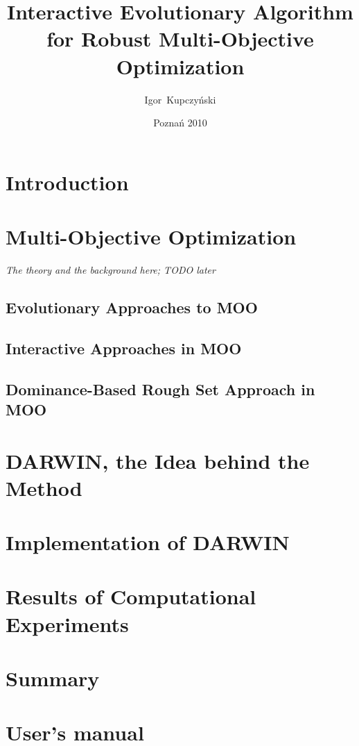 \documentclass[a4paper,english,thesis]{dcsbook}
\author{Igor~Kupczy\'nski}
\date{Pozna\'n 2010}
\title{Interactive Evolutionary Algorithm \\ for Robust Multi-Objective
  Optimization}
\begin{document}
\maketitle
\frontmatter
\tableofcontents{}
\mainmatter

\chapter{Introduction}

\chapter{Multi-Objective Optimization}
\textit{The theory and the background here; TODO later}
\section{Evolutionary Approaches to MOO}
\label{sec_ea_in_moo}
\section{Interactive Approaches in MOO}
\label{sec_ia_in_moo}
\section{Dominance-Based Rough Set Approach in MOO}
\label{sec_drsa_in_moo}

\chapter{DARWIN, the Idea behind the Method}
\label{darwin-the-idea}

\chapter{Implementation of DARWIN}
\label{darwin-implementation}


\chapter{Results of Computational Experiments}
\label{exp-results}


\chapter{Summary}


\backmatter



\appendix
\appendixpage
\addappheadtotoc
\chapter{User's manual}
\label{user-manual}
\end{document}
